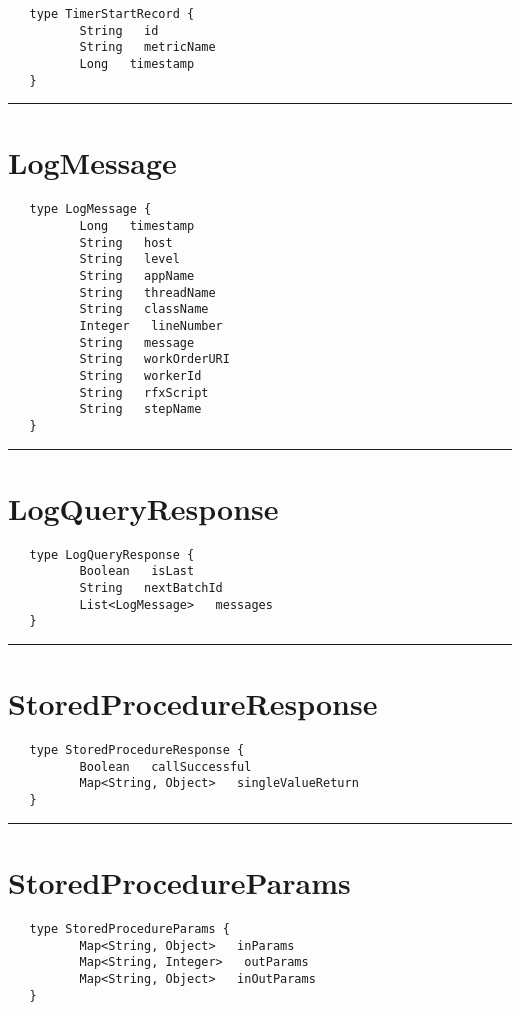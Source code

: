 \begin{verbatim}
   type TimerStartRecord {
          String   id
          String   metricName
          Long   timestamp
   }
\end{verbatim}

\rule{15cm}{2pt}
\section{LogMessage}
\label{type:LogMessage}

\begin{verbatim}
   type LogMessage {
          Long   timestamp
          String   host
          String   level
          String   appName
          String   threadName
          String   className
          Integer   lineNumber
          String   message
          String   workOrderURI
          String   workerId
          String   rfxScript
          String   stepName
   }
\end{verbatim}

\rule{15cm}{2pt}
\section{LogQueryResponse}
\label{type:LogQueryResponse}

\begin{verbatim}
   type LogQueryResponse {
          Boolean   isLast
          String   nextBatchId
          List<LogMessage>   messages
   }
\end{verbatim}

\rule{15cm}{2pt}
\section{StoredProcedureResponse}
\label{type:StoredProcedureResponse}

\begin{verbatim}
   type StoredProcedureResponse {
          Boolean   callSuccessful
          Map<String, Object>   singleValueReturn
   }
\end{verbatim}

\rule{15cm}{2pt}
\section{StoredProcedureParams}
\label{type:StoredProcedureParams}

\begin{verbatim}
   type StoredProcedureParams {
          Map<String, Object>   inParams
          Map<String, Integer>   outParams
          Map<String, Object>   inOutParams
   }
\end{verbatim}

